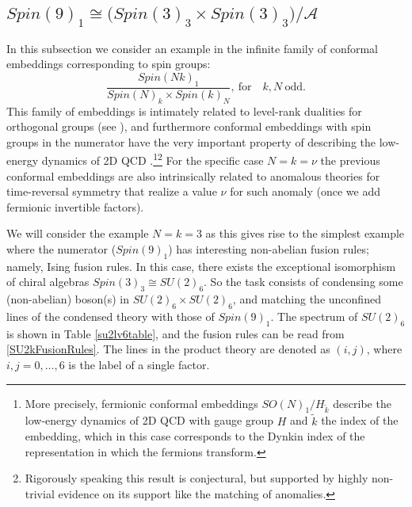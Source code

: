 \documentclass[11pt]{article}
\numberwithin{equation}{section}
\begin{document}
\subsection{$Spin(9)_{1} \cong \big( Spin(3)_{3} \times Spin(3)_{3} \big)/\mathcal{A}$} \label{su26su26intospin91}

In this subsection we consider an example in the infinite family of conformal embeddings corresponding to spin groups:
\begin{equation}
    \frac{Spin(Nk)_{1}}{Spin(N)_{k} \times Spin(k)_{N}}, \ \mathrm{for} \quad k,N \ \mathrm{odd}.
\end{equation}
This family of embeddings is intimately related to level-rank dualities for orthogonal groups (see \cite{Aharony:2016jvv,Cordova:2017vab, Cordova:2017kue}), and furthermore conformal embeddings with spin groups in the numerator have the very important property of describing the low-energy dynamics of 2D QCD \cite{Komargodski:2020mxz,Delmastro:2021otj,Delmastro:2022prj}.\footnote{More precisely, fermionic conformal embeddings $SO(N)_{1}/ H_{\tilde{k}}$ describe the low-energy dynamics of 2D QCD with gauge group $H$ and $\tilde{k}$ the index of the embedding, which in this case corresponds to the Dynkin index of the representation in which the fermions transform.}\footnote{Rigorously speaking this result is conjectural, but supported by highly non-trivial evidence on its support like the matching of anomalies.} For the specific case $N=k=\nu$ the previous conformal embeddings are also intrinsically related to anomalous theories for time-reversal symmetry that realize a value $\nu$ for such anomaly \cite{cheng2018microscopic, Cordova:2017kue} (once we add fermionic invertible factors).



We will consider the example $N=k=3$ as this gives rise to the simplest example where the numerator ($Spin(9)_{1}$) has interesting non-abelian fusion rules; namely, Ising fusion rules. In this case, there exists the exceptional isomorphism of chiral algebras $Spin(3)_{3} \cong SU(2)_{6}$. So the task consists of condensing some (non-abelian) boson(s) in $SU(2)_{6} \times SU(2)_{6}$, and matching the unconfined lines of the condensed theory with those of $Spin(9)_{1}$. The spectrum of $SU(2)_{6}$ is shown in Table \ref{su2lv6table}, and the fusion rules can be read from \eqref{SU2kFusionRules}. The lines in the product theory are denoted as $(i,j)$, where $i,j=0,\ldots,6$ is the label of a single factor.
\end{document}
